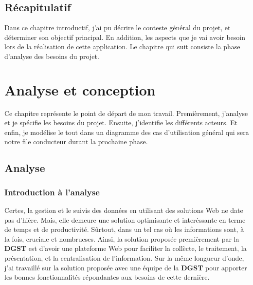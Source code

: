 \documentclass[a4paper]{report}
\begin{document}
\begin{doublespace}
    \section{Récapitulatif}
    Dans ce chapitre introductif, j'ai pu décrire le conteste général du projet, et
    déterminer son objectif principal. En addition, les aspects que je vai
    avoir besoin lors de la réalisation de cette application.
    Le chapitre qui suit consiste la phase d'analyse des besoins du projet.
    \newpage
    \chapter{Analyse et conception}
    \renewcommand{\headrulewidth}{1pt}
    \fancyhead[L]{\hspace*{5cm}}
    \begin{doublespace}
        Ce chapitre représente le point de départ de mon travail. Premièrement, j'analyse et
        je spécifie les besoins du projet. Ensuite, j'identifie les différents acteurs. Et enfin, je
        modélise le tout dans un diagramme des cas d’utilisation général qui sera notre file conducteur
        durant la prochaine phase.
        \section{Analyse}
        \subsection{Introduction à l'analyse}
        Certes, la gestion et le suivis des données en utilisant des solutions Web ne date pas d'hière. Mais,
        elle demeure une solution optimisante et interéssante en terme de temps et de productivité. Sûrtout,
        dans un tel cas où les informations sont, à la fois, cruciale et nombrueses. Ainsi, la solution
        proposée premièrement par la \textbf{DGST} est d'avoir une plateforme Web pour faciliter la collècte,
        le traitement, la présentation, et la centralisation de l'information. Sur la même longueur d'onde, j'ai
        travaillé sur la solution proposée avec une équipe de la \textbf{DGST} pour apporter les bonnes
        fonctionnalités répondantes aux besoins de cette dernière.

\end{doublespace}
\end{doublespace}
\end{document}
